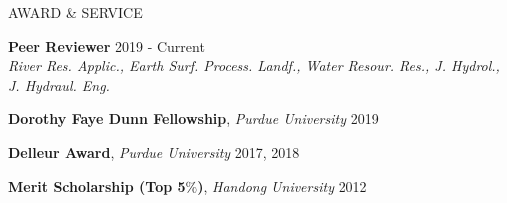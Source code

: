 \documentclass{resume_anzy} %
\begin{document}
\begin{rSection}{AWARD \& SERVICE}
\vspace{-2.5mm}
\item \textbf{Peer Reviewer} \hfill{2019 - Current} \\
\textit{River Res. Applic., Earth Surf. Process. Landf., Water Resour. Res., J. Hydrol., J. Hydraul. Eng.}

\item \textbf{Dorothy Faye Dunn Fellowship}, \textit{Purdue University} \hfill{2019}


\item \textbf{Delleur Award}, \textit{Purdue University} \hfill{2017, 2018}


\item \textbf{Merit Scholarship (Top 5$\%$)}, \textit{Handong University} \hfill{2012}
\end{rSection}


\end{document}
